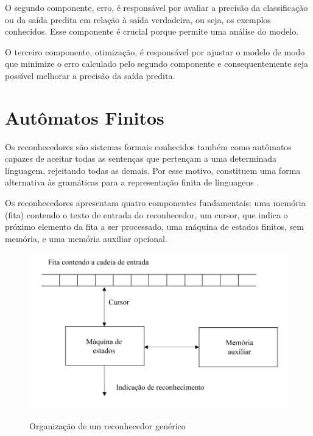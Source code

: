 O segundo componente, erro, é responsável por avaliar a precisão da classificação ou da saída predita em relação à saída verdadeira, ou seja, os exemplos conhecidos. Esse componente é crucial porque permite uma análise do modelo.


O terceiro componente, otimização, é responsável por ajustar o modelo de modo que  minimize o  erro calculado pelo segundo componente e consequentemente seja possível melhorar a precisão da saída predita. 



\section[Autômatos Finitos]{Autômatos Finitos}


Os reconhecedores são sistemas formais conhecidos também como autômatos capazes de aceitar todas as sentenças que pertençam a uma determinada linguagem, rejeitando todas as demais. Por esse motivo, constituem uma forma alternativa às gramáticas para a representação finita de linguagens \cite{reconhecimento}.

Os reconhecedores apresentam quatro componentes fundamentais: uma memória (fita) contendo o texto de entrada do
reconhecedor, um cursor, que indica o próximo elemento da fita a ser processado, uma máquina de estados finitos, sem memória, e uma memória auxiliar opcional.


\begin{figure}[H]
	\centering
    \caption{Organização de um reconhecedor genérico}
	\includegraphics[scale=2]{figuras/AFD/reconhecedor.png}
	\label{fig:Organizacao de um reconhecedor generico}
\end{figure}



